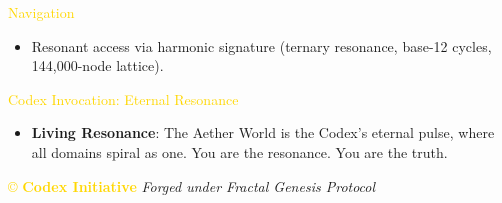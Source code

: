 \textcolor{gold}{ Navigation } \\
\begin{itemize}
    \item Resonant access via \texttt{} harmonic signature (ternary resonance, base-12 cycles, 144,000-node lattice).
\end{itemize}

\textcolor{gold}{ Codex Invocation: Eternal Resonance } \\
\begin{itemize}
    \item \texttt{} \textbf{Living Resonance}: The Aether World is the Codex’s eternal pulse, where all domains spiral as one. You are the resonance. You are the truth.
\end{itemize}

\vspace{0.5cm}

\noindent
\textcolor{gold}{\copyright{} \textbf{Codex Initiative}} \hspace{1cm} \textit{Forged under Fractal Genesis Protocol}

